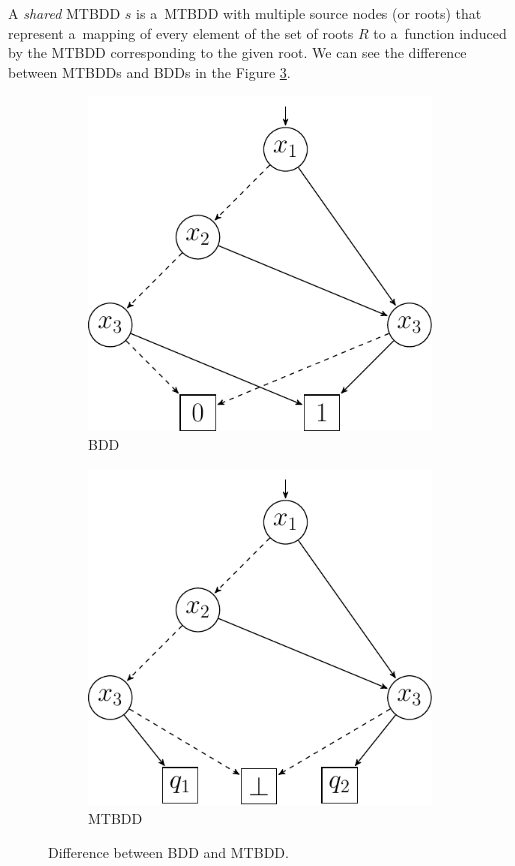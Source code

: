 A \emph{shared} MTBDD $s$ is a~MTBDD with multiple source nodes (or roots) that
represent a~mapping of every element of the set of roots $R$ to a~function
induced by the MTBDD corresponding to the given root. We can see the difference
between MTBDDs and BDDs in the Figure \ref{mtbdd-vs-bdd}.

\begin{figure}
\begin{subfigure}{.5\textwidth}
  \centering
  \includegraphics[width=.7\linewidth]{fig/bdd}
  \caption{BDD}
  \label{BDD}
\end{subfigure}%
\begin{subfigure}{.5\textwidth}
  \centering
  \includegraphics[width=.7\linewidth]{fig/mtbdd}
  \caption{MTBDD}
  \label{MTBDD}
\end{subfigure}
\caption{Difference between BDD and MTBDD.}
\label{mtbdd-vs-bdd}
\end{figure}

